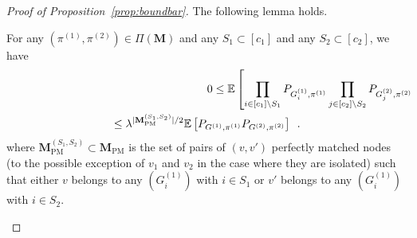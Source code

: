 \documentclass[final]{colt2026}
\newcommand{\1}{\mathbf{1}}
\begin{document}
\begin{proof}[Proof of Proposition~\ref{prop:boundbar}]
The following lemma holds.
\begin{lemma}\label{lem:unioncomp}
For any $(\pi^{(1)},\pi^{(2)})\in \Pi(\mathbf{M})$ and any $S_1\subset [c_1]$ and any $S_2\subset [c_2]$, we have 
\begin{multline*}
\lefteqn{0 \leq \mathbb E\left[\prod_{i\in [c_1]\setminus S_1}P_{G^{(1)}_i,\pi^{(1)}}\prod_{j\in [c_2]\setminus S_2}P_{G^{(2)}_j,\pi^{(2)}}\right] \mathbb E\left[\prod_{i\in S_1}P_{G^{(1)}_i,\pi^{(1)}}\right]\mathbb E\left[\prod_{i\in S_2}P_{G^{(2)}_i,\pi^{(2)}}\right]}\\ \leq \lambda^{|\mathbf M_{\mathrm{PM}}^{(S_1,S_2)}|/2} \mathbb{E}\left[P_{G^{(1)}, \pi^{(1)}}P_{G^{(2)}, \pi^{(2)}}\right]\enspace .
\end{multline*}
    where $\mathbf M_{\mathrm{PM}}^{(S_1,S_2)}\subset \mathbf M_{\mathrm{PM}}$ is the set of pairs of $(v,v')$ perfectly matched nodes (to the possible exception of  $v_1$ and $v_2$ in the case where they are isolated) such that either $v$ belongs to  any  $(G^{(1)}_i)$ with $i\in S_1$ or $v'$ belongs to  any  $(G^{(1)}_i)$ with $i\in S_2$. 
\end{lemma}


\end{proof}
\end{document}
